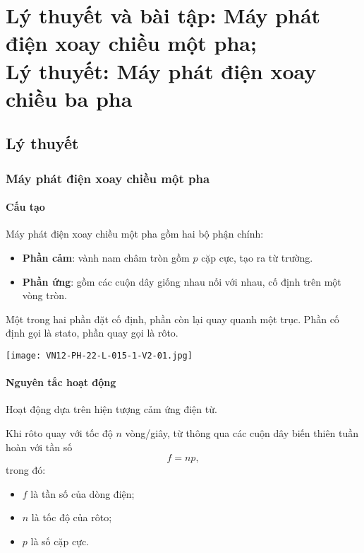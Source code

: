 
\chapter[Lý thuyết và bài tập:\\ Máy phát điện xoay chiều một pha;\\Lý thuyết:\\ Máy phát điện xoay chiều ba pha]{Lý thuyết và bài tập: Máy phát điện xoay chiều một pha;\\	Lý thuyết: Máy phát điện xoay chiều ba pha}
\section{Lý thuyết}
\subsection{Máy phát điện xoay chiều một pha}
\subsubsection{Cấu tạo}
Máy phát điện xoay chiều một pha gồm hai bộ phận chính:
\begin{itemize}
	\item \textbf{Phần cảm}: vành nam châm tròn gồm $p$ cặp cực, tạo ra từ trường. 
	\item \textbf{Phần ứng}: gồm các cuộn dây giống nhau nối với nhau, cố định trên một vòng tròn.  
\end{itemize}
Một trong hai phần đặt cố định, phần còn lại quay quanh một trục. Phần cố định gọi là stato, phần quay gọi là rôto.
\begin{center}
	\texttt{[image: VN12-PH-22-L-015-1-V2-01.jpg]}
\end{center}
\subsubsection{Nguyên tắc hoạt động}
Hoạt động dựa trên hiện tượng cảm ứng điện từ.

Khi rôto quay với tốc độ $n$ vòng/giây, từ thông qua các cuộn dây biến thiên tuần hoàn với tần số
\begin{equation*}
	f=np,
\end{equation*}
trong đó:
\begin{itemize}
	\item $f$ là tần số của dòng điện;
	\item $n$ là tốc độ của rôto;
	\item $p$ là số cặp cực.
\end{itemize}

